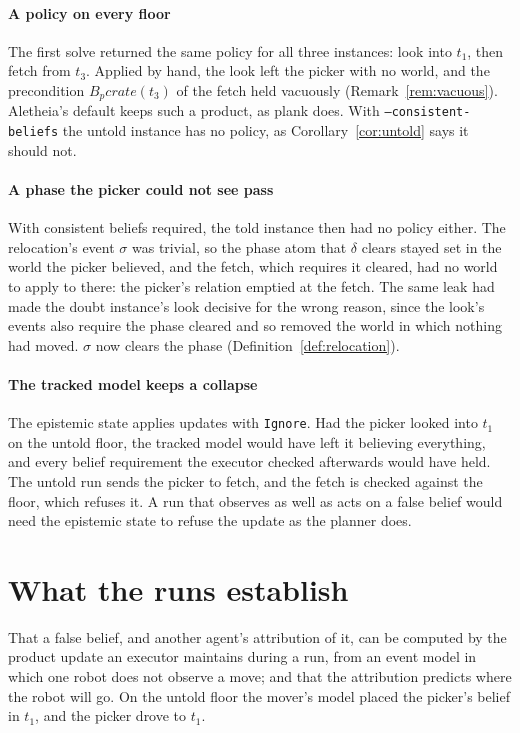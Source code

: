 \documentclass[11pt,a4paper]{article}
\theoremstyle{definition}
\newcommand{\Bop}[1]{B_{#1}}
\newcommand{\code}[1]{\texttt{\small #1}}
\newcommand{\ag}[1]{\mathit{#1}}
\newcommand{\pk}{\ag{p}}
\newcommand{\crate}{\mathit{crate}}
\begin{document}
\paragraph{A policy on every floor} The first solve returned the same policy for
all three instances: look into $t_1$, then fetch from $t_3$. Applied by hand,
the look left the picker with no world, and the precondition
$\Bop{\pk}\crate(t_3)$ of the fetch held vacuously
(Remark~\ref{rem:vacuous}). Aletheia's default keeps such a product, as plank
does. With \code{--consistent-beliefs} the untold instance has no policy, as
Corollary~\ref{cor:untold} says it should not.

\paragraph{A phase the picker could not see pass} With consistent beliefs
required, the told instance then had no policy either. The relocation's event
$\sigma$ was trivial, so the phase atom that $\delta$ clears stayed set in the
world the picker believed, and the fetch, which requires it cleared, had no
world to apply to there: the picker's relation emptied at the fetch. The same
leak had made the doubt instance's look decisive for the wrong reason, since
the look's events also require the phase cleared and so removed the world in
which nothing had moved. $\sigma$ now clears the phase
(Definition~\ref{def:relocation}).

\paragraph{The tracked model keeps a collapse} The epistemic state applies
updates with \code{Ignore}. Had the picker looked into $t_1$ on the untold
floor, the tracked model would have left it believing everything, and every
belief requirement the executor checked afterwards would have held. The
untold run sends the picker to fetch, and the fetch is checked against the
floor, which refuses it. A run that observes as well as acts on a false belief
would need the epistemic state to refuse the update as the planner does.

\section{What the runs establish}
\label{sec:established}

That a false belief, and another agent's attribution of it, can be computed by
the product update an executor maintains during a run, from an event model in
which one robot does not observe a move; and that the attribution predicts
where the robot will go. On the untold floor the mover's model placed the
picker's belief in $t_1$, and the picker drove to $t_1$.
\end{document}

